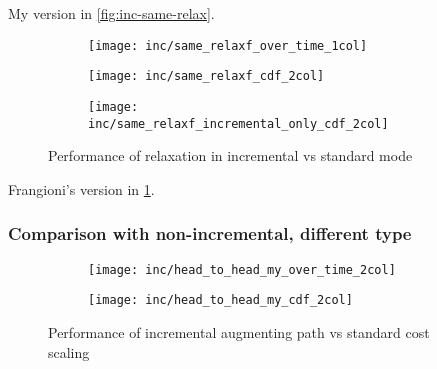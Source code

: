 My version in \cref{fig:inc-same-relax}.

\begin{figure}
    \begin{widepage} 
    \begin{subfigure}[c]{\textwidth}
        \texttt{[image: inc/same\_relaxf\_over\_time\_1col]}
    \end{subfigure}
    \begin{subfigure}[c]{0.5\textwidth}
        \texttt{[image: inc/same\_relaxf\_cdf\_2col]}
    \end{subfigure}
    \begin{subfigure}[c]{0.5\textwidth}
        \texttt{[image: inc/same\_relaxf\_incremental\_only\_cdf\_2col]}
    \end{subfigure}
    \end{widepage}
    \caption{Performance of relaxation in incremental vs standard mode}
    \label{fig:inc-same-relaxf}
\end{figure}

Frangioni's version in \cref{fig:inc-same-relaxf}. 

\subsubsection{Comparison with non-incremental, different type}

\begin{figure}
    \begin{widepage}
    \begin{subfigure}[c]{0.5\textwidth}
        \texttt{[image: inc/head\_to\_head\_my\_over\_time\_2col]}
    \end{subfigure}
    \begin{subfigure}[c]{0.5\textwidth}
        \texttt{[image: inc/head\_to\_head\_my\_cdf\_2col]}
    \end{subfigure}
    \end{widepage}
    \caption{Performance of incremental augmenting path vs standard cost scaling}
    \label{fig:inc-head-to-head-my}
\end{figure}

